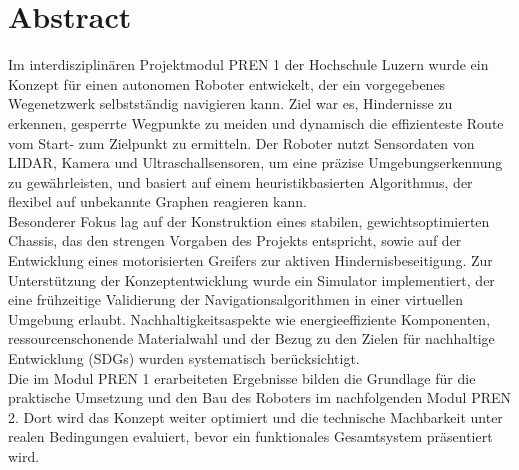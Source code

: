 \documentclass[main.tex]{subfiles} %
\begin{document}
\section*{Abstract}

Im interdisziplinären Projektmodul PREN 1 der Hochschule Luzern wurde ein Konzept 
für einen autonomen Roboter entwickelt, der ein vorgegebenes Wegenetzwerk selbstständig 
navigieren kann. Ziel war es, Hindernisse zu 
erkennen, gesperrte Wegpunkte zu meiden und dynamisch die effizienteste Route vom 
Start- zum Zielpunkt zu ermitteln. Der Roboter nutzt Sensordaten von LIDAR, Kamera 
und Ultraschallsensoren, um eine präzise Umgebungserkennung zu gewährleisten, und 
basiert auf einem heuristikbasierten Algorithmus, der flexibel auf unbekannte 
Graphen reagieren kann.\\

Besonderer Fokus lag auf der Konstruktion eines stabilen, gewichtsoptimierten Chassis, 
das den strengen Vorgaben des Projekts entspricht, sowie auf der Entwicklung eines 
motorisierten Greifers zur aktiven Hindernisbeseitigung. Zur Unterstützung der 
Konzeptentwicklung wurde ein Simulator implementiert, der eine frühzeitige Validierung 
der Navigationsalgorithmen in einer virtuellen Umgebung erlaubt. 
Nachhaltigkeitsaspekte wie energieeffiziente Komponenten, ressourcenschonende 
Materialwahl und der Bezug zu den Zielen für nachhaltige Entwicklung (SDGs) wurden 
systematisch berücksichtigt.\\

Die im Modul PREN 1 erarbeiteten Ergebnisse bilden die Grundlage für die praktische 
Umsetzung und den Bau des Roboters im nachfolgenden Modul PREN 2. Dort wird das 
Konzept weiter optimiert und die technische Machbarkeit unter realen Bedingungen 
evaluiert, bevor ein funktionales Gesamtsystem präsentiert wird.
\end{document}
